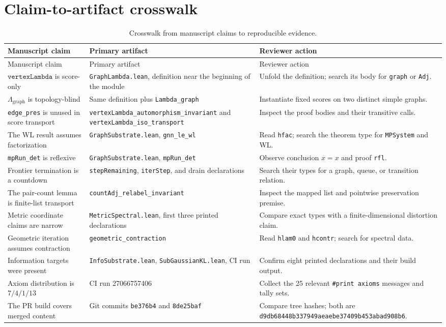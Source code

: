 \documentclass[10pt,letterpaper]{article}
\theoremstyle{definition}
\newcommand{\Lgraph}{\Lambda_{\mathrm{graph}}}
\newcommand{\decl}[1]{\nolinkurl{#1}}
\newcommand{\sha}[2]{\texttt{#1}\allowbreak\texttt{#2}}
\newcommand{\shortcommit}{\texttt{8de25baf}}
\begin{document}
\section{Claim-to-artifact crosswalk}\label{app:crosswalk}
\begin{longtable}{@{}L{0.25\textwidth}L{0.31\textwidth}L{0.36\textwidth}@{}}
\caption{Crosswalk from manuscript claims to reproducible evidence.}\\
\toprule
Manuscript claim & Primary artifact & Reviewer action \\
\midrule
\endfirsthead
\toprule
Manuscript claim & Primary artifact & Reviewer action \\
\midrule
\endhead
\(\texttt{vertexLambda}\) is score-only &
\texttt{GraphLambda.lean}, definition near the beginning of the module &
Unfold the definition; search its body for \texttt{graph} or \texttt{Adj}. \\
\(\Lgraph\) is topology-blind &
Same definition plus \texttt{Lambda\_graph} &
Instantiate fixed scores on two distinct simple graphs. \\
\texttt{edge\_pres} is unused in score transport &
\decl{vertexLambda_automorphism_invariant} and
\decl{vertexLambda_iso_transport} &
Inspect the proof bodies and their transitive calls. \\
The WL result assumes factorization &
\texttt{GraphSubstrate.lean}, \texttt{gnn\_le\_wl} &
Read \texttt{hfac}; search the theorem type for \texttt{MPSystem} and WL. \\
\texttt{mpRun\_det} is reflexive &
\texttt{GraphSubstrate.lean}, \texttt{mpRun\_det} &
Observe conclusion \(x=x\) and proof \texttt{rfl}. \\
Frontier termination is a countdown &
\texttt{stepRemaining}, \texttt{iterStep}, and drain declarations &
Search their types for a graph, queue, or transition relation. \\
The pair-count lemma is finite-list transport &
\decl{countAdj_relabel_invariant} &
Inspect the mapped list and pointwise preservation premise. \\
Metric coordinate claims are narrow &
\texttt{MetricSpectral.lean}, first three printed declarations &
Compare exact types with a finite-dimensional distortion claim. \\
Geometric iteration assumes contraction &
\texttt{geometric\_contraction} &
Read \texttt{hlam0} and \texttt{hcontr}; search for spectral data. \\
Information targets were present &
\texttt{InfoSubstrate.lean}, \texttt{SubGaussianKL.lean}, CI run &
Confirm eight printed declarations and their build output. \\
Axiom distribution is \(7/4/1/13\) &
CI run 27066757406 &
Collect the 25 relevant \texttt{\#print axioms} messages and tally sets. \\
The PR build covers merged content &
Git commits \texttt{be376b4} and \shortcommit &
Compare tree hashes; both are
\sha{d9db68448b337949aeae}{be37409b453abad908b6}. \\
\bottomrule
\end{longtable}
\end{document}
